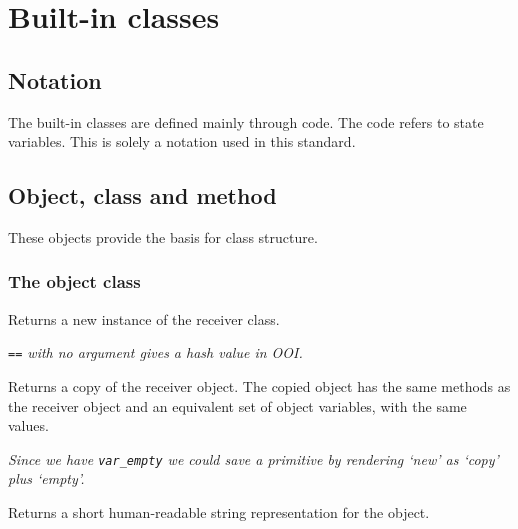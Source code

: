 \chapter{Built-in classes}\label{built-in-classes}

\section{Notation}\label{notation}

The built-in classes are defined mainly through code. The code refers to
state variables. This is solely a notation used in this standard.

\section{Object, class and method}\label{object-class-and-method}

These objects provide the basis for class structure.

\subsection{The object class}\label{the-object-class}



Returns a new instance of the receiver class.



\emph{\texttt{\textquotesingle{}==\textquotesingle{}} with no argument
gives a hash value in OOI.}



Returns a copy of the receiver object. The copied object has the same
methods as the receiver object and an equivalent set of object
variables, with the same values.



\emph{Since we have \texttt{var\_empty} we could save a primitive by
rendering `new' as `copy' plus `empty'.}



Returns a short human-readable string representation for the object.

